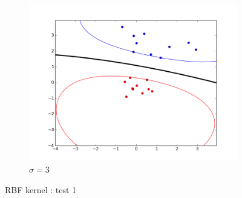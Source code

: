 \documentclass{article}
\begin{document}
\begin{figure}[!h]
\begin{subfigure}[b]{0.3\textwidth}
    \end{subfigure}
     ~ 
    \begin{subfigure}[b]{0.3\textwidth}
        \includegraphics[width=1.2\textwidth]{images/rbf/1/figure_3.png}
        \caption{$\sigma = 3$}  \label{rbf_1_figure_3}
    \end{subfigure}
    \caption{RBF kernel : test 1}
    \label{rbf_1}
\end{figure}
\end{document}
